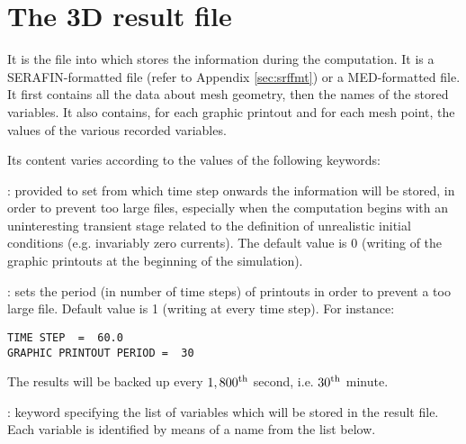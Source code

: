 \section{The 3D result file}
\label{sec:3dres}
It is the file into which  stores the information during the
computation. It is a SERAFIN-formatted file (refer to Appendix
\ref{sec:srffmt}) or a MED-formatted file. It first contains all the data about
mesh geometry, then the names of the stored variables. It also contains, for
each graphic printout and for each mesh point, the values of the various
recorded variables.

Its content varies according to the values of the following keywords:

: provided to set from
which time step onwards the information will be stored, in order to prevent too
large files, especially when the computation begins with an uninteresting
transient stage related to the definition of unrealistic initial conditions
(e.g. invariably zero currents). The default value is 0 (writing of the graphic
printouts at the beginning of the simulation).

: sets the period (in number of time steps) of
printouts in order to prevent a too large file.  Default value is 1 (writing at
every time step). For instance:

\begin{lstlisting}[language=TelemacCas]
TIME STEP  =  60.0
GRAPHIC PRINTOUT PERIOD =  30
\end{lstlisting}

The results will be backed up every ${1,800}^{\rm{th}}$ second, i.e.
${30}^{\rm{th}}$ minute.

: keyword specifying the list of
variables which will be stored in the result file. Each variable is identified
by means of a name from the list below.

